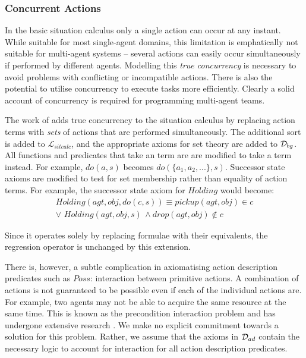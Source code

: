 \subsubsection{Concurrent Actions}

\label{sec:Background:Concurrent-Actions}

In the basic situation calculus only a single action can occur at
any instant. While suitable for most single-agent domains, this limitation
is emphatically not suitable for multi-agent systems -- several actions
can easily occur simultaneously if performed by different agents.
Modelling this \emph{true concurrency} is necessary to avoid problems
with conflicting or incompatible actions. There is also the potential
to utilise concurrency to execute tasks more efficiently. Clearly
a solid account of concurrency is required for programming multi-agent
teams.

The work of \citep{lin92sc_conc,pinto94temporal,reiter96sc_nat_conc}
adds true concurrency to the situation calculus by replacing action
terms with \emph{sets} of actions that are performed simultaneously.
The additional sort  is added to $\mathcal{L}_{sitcalc}$,
and the appropriate axioms for set theory are added to $\mathcal{D}_{bg}$.
All functions and predicates that take an  term are are
modified to take a  term instead. For example, $do(a,s)$
becomes $do(\{a_{1},a_{2},...\},s)$. Successor state axioms are modified
to test for set membership rather than equality of action terms. For
example, the successor state axiom for $Holding$ would become:\begin{multline*}
Holding(agt,obj,do(c,s))\equiv pickup(agt,obj)\in c\\
\vee\,\, Holding(agt,obj,s)\,\wedge drop(agt,obj)\not\in c\end{multline*}


Since it operates solely by replacing formulae with their equivalents,
the regression operator is unchanged by this extension.

There is, however, a subtle complication in axiomatising action description
predicates such as $Poss$: interaction between primitive actions.
A combination of actions is not guaranteed to be possible even if
each of the individual actions are. For example, two agents may not
be able to acquire the same resource at the same time. This is known
as the precondition interaction problem and has undergone extensive
research \citep{pinto94temporal,pinto98interacting_effects,pinto00action_interaction}.
We make no explicit commitment towards a solution for this problem.
Rather, we assume that the axioms in $\mathcal{D}_{ad}$ contain the necessary
logic to account for interaction for all action description predicates.

